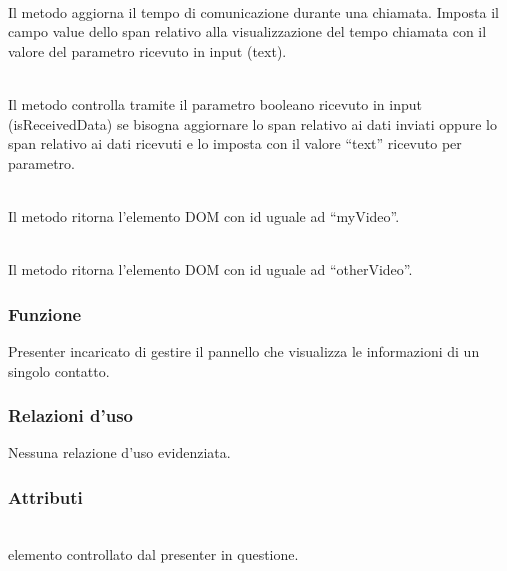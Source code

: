 \begin{description}
\item{}\\
Il metodo aggiorna il tempo di comunicazione durante una chiamata. Imposta il campo value dello span relativo alla visualizzazione del tempo chiamata con il valore del parametro ricevuto in input (text).

\item{}\\
Il metodo controlla tramite il parametro booleano ricevuto in input (isReceivedData) se bisogna aggiornare lo span relativo ai dati inviati oppure lo span relativo ai dati ricevuti e lo imposta con il valore ``text'' ricevuto per parametro.

\item{}\\
Il metodo ritorna l'elemento DOM con id uguale ad ``myVideo''.

\item{}\\
Il metodo ritorna l'elemento DOM con id uguale ad ``otherVideo''.

\end{description}


\subsubsection*{Funzione}
Presenter incaricato di gestire il pannello che visualizza le informazioni di un singolo contatto.

\subsubsection*{Relazioni d'uso}
Nessuna relazione d'uso evidenziata.

\subsubsection*{Attributi}
\begin{description}
\item{}\\
  elemento controllato dal presenter in questione.
\end{description}

